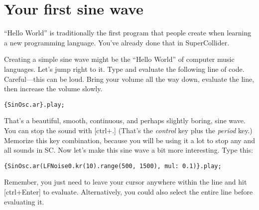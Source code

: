 \section{Your first sine wave \label{sec:first-sine}}


``Hello World'' is traditionally the first program that people create when learning a new programming language. You've already done that in SuperCollider.

Creating a simple sine wave might be the ``Hello World'' of computer music languages. Let's jump right to it. Type and evaluate the following line of code. Careful---this can be loud. Bring your volume all the way down, evaluate the line, then increase the volume slowly.

 
\begin{lstlisting}[style=SuperCollider-IDE, basicstyle=\scttfamily\footnotesize]
{SinOsc.ar}.play;
\end{lstlisting}
 

That's a beautiful, smooth, continuous, and perhaps slightly boring, sine wave. You can stop the sound with [ctrl+.] (That's the \emph{control} key plus the \emph{period} key.) Memorize this key combination, because you will be using it a lot to stop any and all sounds in SC. Now let's make this sine wave a bit more interesting. Type this:

 
\begin{lstlisting}[style=SuperCollider-IDE, basicstyle=\scttfamily\footnotesize ]
{SinOsc.ar(LFNoise0.kr(10).range(500, 1500), mul: 0.1)}.play;
\end{lstlisting}
 

Remember, you just need to leave your cursor anywhere within the line and hit [ctrl+Enter] to evaluate. Alternatively, you could also select the entire line before evaluating it.

 
\bigskip
{}